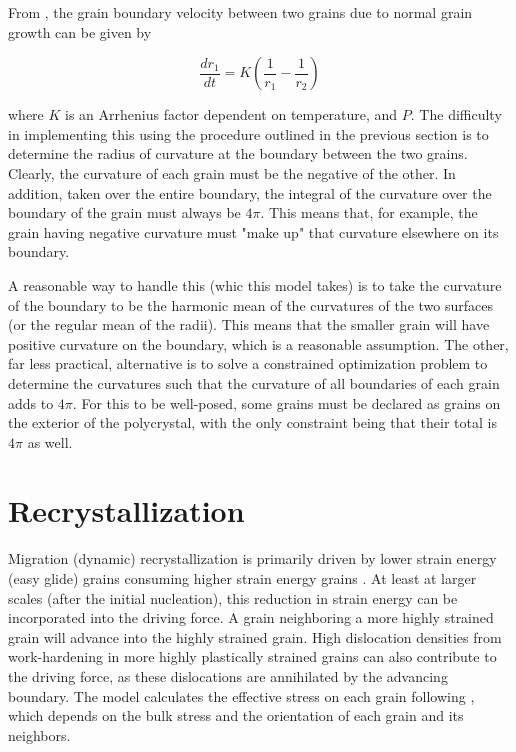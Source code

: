 \documentclass{article}
\begin{document}
From \citet{durand2006}, the grain boundary velocity between two grains due to normal grain growth can be given by

\[\frac{dr_1}{dt} = K \left( \frac{1}{r_1}-\frac{1}{r_2} \right)
\]

where $K$ is an Arrhenius factor dependent on temperature, and $P$. The difficulty in implementing this using the procedure outlined in the previous section is to determine the radius of curvature at the boundary between the two grains. Clearly, the curvature of each grain must be the negative of the other. In addition, taken over the entire boundary, the integral of the curvature over the boundary of the grain must always be $4 \pi$. This means that, for example, the grain having negative curvature must "make up" that curvature elsewhere on its boundary. 

A reasonable way to handle this (whic this model takes)  is to take the curvature of the boundary to be the harmonic mean of the curvatures of the two surfaces (or the regular mean of the radii). This means that the smaller grain will have positive curvature on the boundary, which is a reasonable assumption. The other, far less practical, alternative is to solve a constrained optimization problem to determine the curvatures such that the curvature of all boundaries of each grain adds to $4 \pi$. For this to be well-posed, some grains must be declared as grains on the exterior of the polycrystal, with the only constraint being that their total is $4 \pi$ as well. 

\section{Recrystallization}
Migration (dynamic) recrystallization is primarily driven by lower strain energy (easy glide) grains consuming higher strain energy grains \citep{duval1995}. At least at larger scales (after the initial nucleation), this reduction in strain energy can be incorporated into the driving force. A grain neighboring a more highly strained grain will advance into the highly strained grain. High dislocation densities from work-hardening in more highly plastically strained grains can also contribute to the driving force, as these dislocations are annihilated by the advancing boundary. The model calculates the effective stress on each grain following \citet{azuma96}, which depends on the bulk stress and the orientation of each grain and its neighbors. 
\end{document}
